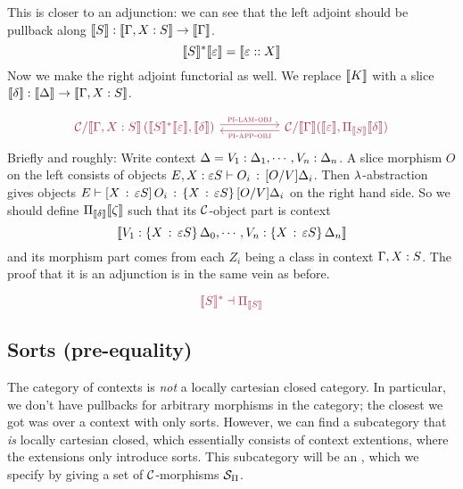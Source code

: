 This is closer to an adjunction: we can see that the left adjoint should be pullback along
$\llbracket S \rrbracket : \llbracket \Gamma,X : S \rrbracket \to \llbracket \Gamma \rrbracket$.
\[ \llbracket  S  \rrbracket^* \llbracket \varepsilon \rrbracket = \llbracket  \varepsilon :: X  \rrbracket\]
Now we make the right adjoint functorial as well.
We replace $\llbracket K \rrbracket$ with a slice $\llbracket \delta \rrbracket : \llbracket \Delta \rrbracket \to \llbracket \Gamma,X : S \rrbracket$.



\[ \color{semantics}
\begin{tikzcd}
  {\CC/\bbrkt{\CtxExt{\Ga}{X}{S}} \, (\bbrkt{ S }^* \bbrkt{\ep} , \bbrkt{\de})} && {\CC/\bbrkt{\Ga}(\bbrkt{\ep},{\Pi_{\bbrkt{S}}\bbrkt{\de}})}
  \arrow["\textsc{pi-lam-obj}", shift left, from=1-1, to=1-3]
  \arrow["\textsc{pi-app-obj}", shift left, from=1-3, to=1-1]
\end{tikzcd}\]
Briefly and roughly: Write context $\Delta = V_{1} : \Delta_{1}, \cdots, V_{n} : \Delta_{n}$.
A slice morphism $O$ on the left consists of objects $E,X : \varepsilon S \vdash O_{i} \, : \, [O / V] \Delta_{i}$.
Then $\lambda$-abstraction gives objects $E \vdash [X \, : \, \varepsilon S] \, O_{i} \, : \, \{X \, : \, \varepsilon S\} \, [O / V] \Delta_{i}$
on the right hand side.
So we should define ${\Pi_{\llbracket \delta \rrbracket}\llbracket \zeta \rrbracket}$ such that its $\mathcal{C}$-object part is context
\[
  \llbracket V_{1} : \{X \, : \, \varepsilon S\} \, {\Delta_{0}}, \cdots, V_{n} : {\{X \, : \, \varepsilon S\} \, {\Delta_{n}}} \rrbracket
\]
and its morphism part comes from each $Z_{i}$ being a class in context $\Gamma,X : S$.
The proof that it is an adjunction is in the same vein as before.

\[
  \color{semantics}
  \bbrkt{S}^{*} \dashv \Pi_{\bbrkt{S}}\]

\subsection{Sorts (pre-equality)}
The category of contexts is \textit{not} a locally cartesian closed category.
In particular, we don't have pullbacks for arbitrary morphisms in the category;
the closest we got was over a context with only sorts.
However, we can find a subcategory that \textit{is} locally cartesian closed,
which essentially consists of context extentions, where the extensions only introduce sorts.
This subcategory will be an ,
which we specify by giving a set of $\mathcal{C}$-morphisms $\mathcal{S}_{\Pi}$.

